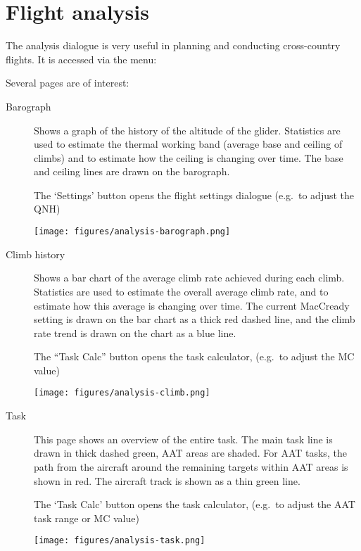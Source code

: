 \section{Flight analysis} \label{sec:analysis-climb}

The analysis dialogue is very useful in planning and conducting
cross-country flights.  It is accessed via the menu:  
\begin{quote}
\blink{}
\end{quote}

Several pages are of interest:
\begin{description}
\item[Barograph]  Shows a graph of the history of the altitude of the glider.
  Statistics are used to estimate the thermal working band (average
  base and ceiling of climbs) and to estimate how the ceiling is
  changing over time.  The base and ceiling lines are drawn on the
  barograph.

  The `Settings' button opens the flight settings dialogue
  (e.g.\ to adjust the QNH)

\begin{center}
\texttt{[image: figures/analysis-barograph.png]}
\end{center}

\item[Climb history]
  Shows a bar chart of the average climb rate achieved during each
  climb.  Statistics are used to estimate the overall average climb
  rate, and to estimate how this average is changing over time.  The
  current MacCready setting is drawn on the bar chart as a thick red
  dashed line, and the climb rate trend is drawn on the chart as a
  blue line.

  The ``Task Calc'' button opens the task calculator,
  (e.g.\ to adjust the MC value)

\begin{center}
\texttt{[image: figures/analysis-climb.png]}
\end{center}

\item[Task]
  This page shows an overview of the entire task.  The main task line
  is drawn in thick dashed green, AAT areas are shaded.  For AAT
  tasks, the path from the aircraft around the remaining targets within AAT
  areas is shown in red.  The aircraft track is shown as a thin green line.

  The `Task Calc' button opens the task calculator,
  (e.g.\ to adjust the AAT task range or MC value)

\begin{center}
\texttt{[image: figures/analysis-task.png]}
\end{center}

\end{description}

